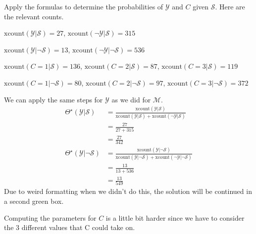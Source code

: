 \documentclass{tufte-handout}
\begin{document}
\begin{exercise}
Apply the formulas to determine the probabilities of $\mathcal{Y}$ and $C$ given $\mathcal{S}$.  Here are the relevant counts.

\bi
\item $\mbox{xcount}(\mathcal{Y}|  \mathcal{S}) = 27$,  $\mbox{xcount}(\neg \mathcal{Y}|  \mathcal{S}) = 315$
\item $\mbox{xcount}(\mathcal{Y}| \neg \mathcal{S}) = 13$,  $\mbox{xcount}(\neg \mathcal{Y}| \neg \mathcal{S}) = 536$
\item $\mbox{xcount}(C=1 | \mathcal{S}) = 136$, $\mbox{xcount}(C=2 | \mathcal{S}) = 87$, $\mbox{xcount}(C=3 | \mathcal{S}) = 119$
\item $\mbox{xcount}(C=1 | \neg \mathcal{S}) = 80$, $\mbox{xcount}(C=2 | \neg \mathcal{S}) = 97$, $\mbox{xcount}(C=3 | \neg \mathcal{S}) = 372$
\ei
\begin{boxedsolution}
We can apply the same steps for $\mathcal{Y}$ as we did for $\mathcal{M}$.
\begin{align}
\Theta^\star(\mathcal{Y}| \mathcal{S}) &= \frac{\mbox{xcount}(\mathcal{Y}| \mathcal{S})}{\mbox{xcount}(\mathcal{Y}| \mathcal{S}) + \mbox{xcount}(\neg \mathcal{Y}|  \mathcal{S}) } \nonumber \\
&= \frac{27}{27+315} \nonumber \\
&= \frac{27}{342} \nonumber \\
\Theta^\star(\mathcal{Y}| \neg \mathcal{S}) &= \frac{\mbox{xcount}(\mathcal{Y}| \neg \mathcal{S})}{\mbox{xcount}(\mathcal{Y}| \neg\mathcal{S}) + \mbox{xcount}(\neg \mathcal{Y}| \neg \mathcal{S}) } \nonumber \\
&= \frac{13}{13+536} \nonumber \\
&= \frac{13}{549}
\end{align}
Due to weird formatting when we didn't do this, the solution will be continued in a second green box.
\end{boxedsolution}

\begin{boxedsolution}
Computing the parameters for $C$ is a little bit harder since we have to consider the 3 different values that C could take on.


\end{boxedsolution}
\end{exercise}
\end{document}
